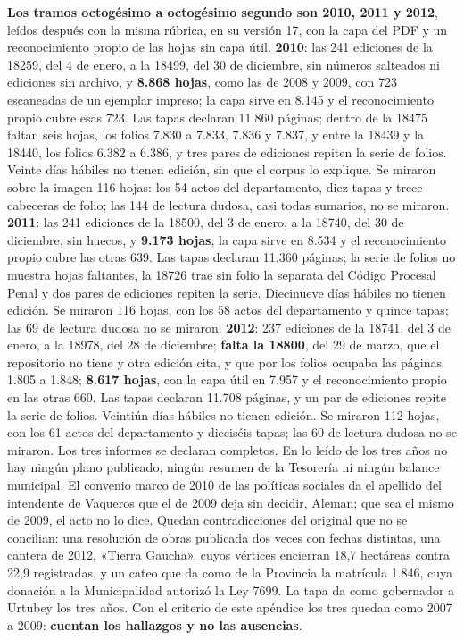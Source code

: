 \textbf{Los tramos octogésimo a octogésimo segundo son 2010, 2011 y 2012}, leídos después con la misma rúbrica, en su versión 17, con la capa del PDF y un reconocimiento propio de las hojas sin capa útil. \textbf{2010}: las 241 ediciones de la 18259, del 4 de enero, a la 18499, del 30 de diciembre, sin números salteados ni ediciones sin archivo, y \textbf{8.868 hojas}, como las de 2008 y 2009, con 723 escaneadas de un ejemplar impreso; la capa sirve en 8.145 y el reconocimiento propio cubre esas 723. Las tapas declaran 11.860 páginas; dentro de la 18475 faltan seis hojas, los folios 7.830 a 7.833, 7.836 y 7.837, y entre la 18439 y la 18440, los folios 6.382 a 6.386, y tres pares de ediciones repiten la serie de folios. Veinte días hábiles no tienen edición, sin que el corpus lo explique. Se miraron sobre la imagen 116 hojas: los 54 actos del departamento, diez tapas y trece cabeceras de folio; las 144 de lectura dudosa, casi todas sumarios, no se miraron. \textbf{2011}: las 241 ediciones de la 18500, del 3 de enero, a la 18740, del 30 de diciembre, sin huecos, y \textbf{9.173 hojas}; la capa sirve en 8.534 y el reconocimiento propio cubre las otras 639. Las tapas declaran 11.360 páginas; la serie de folios no muestra hojas faltantes, la 18726 trae sin folio la separata del Código Procesal Penal y dos pares de ediciones repiten la serie. Diecinueve días hábiles no tienen edición. Se miraron 116 hojas, con los 58 actos del departamento y quince tapas; las 69 de lectura dudosa no se miraron. \textbf{2012}: 237 ediciones de la 18741, del 3 de enero, a la 18978, del 28 de diciembre; \textbf{falta la 18800}, del 29 de marzo, que el repositorio no tiene y otra edición cita, y que por los folios ocupaba las páginas 1.805 a 1.848; \textbf{8.617 hojas}, con la capa útil en 7.957 y el reconocimiento propio en las otras 660. Las tapas declaran 11.708 páginas, y un par de ediciones repite la serie de folios. Veintiún días hábiles no tienen edición. Se miraron 112 hojas, con los 61 actos del departamento y dieciséis tapas; las 60 de lectura dudosa no se miraron. Los tres informes se declaran completos. En lo leído de los tres años no hay ningún plano publicado, ningún resumen de la Tesorería ni ningún balance municipal. El convenio marco de 2010 de las políticas sociales da el apellido del intendente de Vaqueros que el de 2009 deja sin decidir, Aleman; que sea el mismo de 2009, el acto no lo dice. Quedan contradicciones del original que no se concilian: una resolución de obras publicada dos veces con fechas distintas, una cantera de 2012, «Tierra Gaucha», cuyos vértices encierran 18,7 hectáreas contra 22,9 registradas, y un cateo que da como de la Provincia la matrícula 1.846, cuya donación a la Municipalidad autorizó la Ley 7699. La tapa da como gobernador a Urtubey los tres años. Con el criterio de este apéndice los tres quedan como 2007 a 2009: \textbf{cuentan los hallazgos y no las ausencias}.

